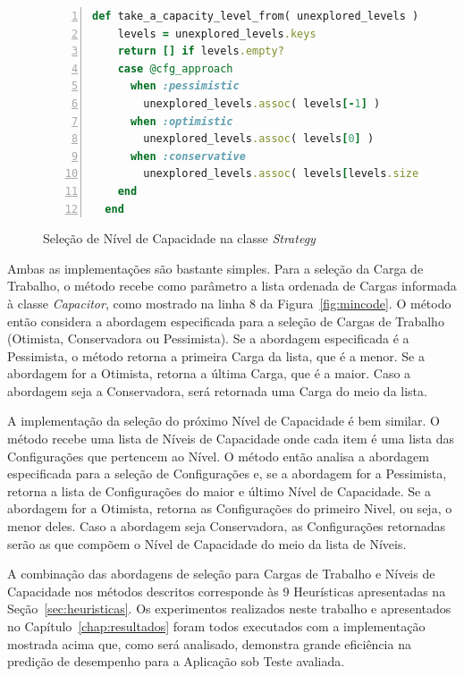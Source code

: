 \begin{figure}[h]
  \begin{lstlisting}[language=Ruby,linewidth=\textwidth,xleftmargin=.04\textwidth, numbers=left]
  def take_a_capacity_level_from( unexplored_levels )
    levels = unexplored_levels.keys
    return [] if levels.empty?
    case @cfg_approach
      when :pessimistic
        unexplored_levels.assoc( levels[-1] )
      when :optimistic
        unexplored_levels.assoc( levels[0] )
      when :conservative
        unexplored_levels.assoc( levels[levels.size / 2] )
    end
  end
  \end{lstlisting}
  \caption{\label{fig:strategy_capacity_code}Seleção de Nível de Capacidade na classe \emph{Strategy}}
\end{figure}

Ambas as implementações são bastante simples. Para a seleção da Carga de Trabalho,
o método recebe como parâmetro a lista ordenada de Cargas informada à classe 
\emph{Capacitor}, como mostrado na linha 8 da Figura~\ref{fig:mincode}. O método 
então considera a abordagem especificada para a seleção de Cargas de Trabalho 
(Otimista, Conservadora ou Pessimista). Se a abordagem especificada é a Pessimista, 
o método retorna a primeira Carga da lista, que é a menor. Se a abordagem for a
Otimista, retorna a última Carga, que é a maior. Caso a abordagem seja a Conservadora,
será retornada uma Carga do meio da lista.

A implementação da seleção do próximo Nível de Capacidade é bem similar. O método
recebe uma lista de Níveis de Capacidade onde cada item é uma lista das Configurações
que pertencem ao Nível. O método então analisa a abordagem especificada para a
seleção de Configurações e, se a abordagem for a Pessimista, retorna a lista de 
Configurações do maior e último Nível de Capacidade. Se a abordagem for a Otimista, 
retorna as Configurações do primeiro Nivel, ou seja, o menor deles. Caso a abordagem
seja Conservadora, as Configurações retornadas serão as que compõem o Nível de 
Capacidade do meio da lista de Níveis.    

A combinação das abordagens de seleção para Cargas de Trabalho e Níveis de 
Capacidade nos métodos descritos corresponde às 9 Heurísticas apresentadas na
Seção~\ref{sec:heuristicas}. Os experimentos realizados neste trabalho e 
apresentados no Capítulo~\ref{chap:resultados} foram todos executados com a 
implementação mostrada acima que, como será analisado, demonstra grande eficiência
na predição de desempenho para a Aplicação sob Teste avaliada.
 
